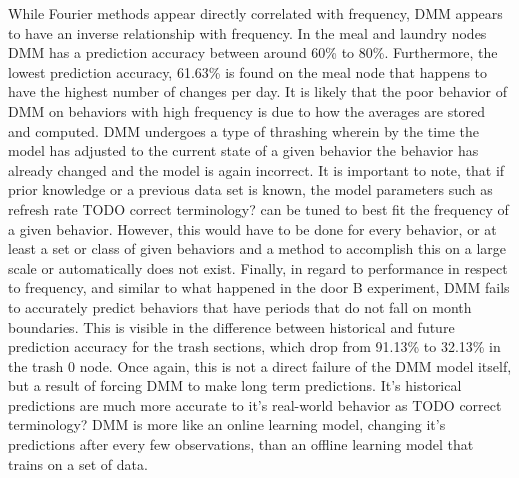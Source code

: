 While Fourier methods appear directly correlated with frequency, DMM
appears to have an inverse relationship with frequency. In the meal and
laundry nodes DMM has a prediction accuracy between around 60\% to 80\%.
Furthermore, the lowest prediction accuracy, 61.63\% is found on the meal
node that happens to have the highest number of changes per day. It is likely
that the poor behavior of DMM on behaviors with high frequency is due to
how the averages are stored and computed. DMM undergoes a type of
thrashing wherein by the time the model has adjusted to the current state of a given
behavior the behavior has already changed and the model is again incorrect. It is important to note, that if prior knowledge
or a previous data set is known, the model parameters such as refresh rate TODO
correct terminology? can be tuned to best fit the frequency of a given behavior.
However, this would have to be done for every behavior, or at least a set or class
of given behaviors and a method to accomplish this on a large scale or automatically does not exist. Finally, in regard to performance in
respect to frequency, and similar to what happened in the door B experiment,
DMM fails to accurately predict behaviors that have periods that do not
fall on month boundaries. This is visible in the difference between historical
and future prediction accuracy for the trash sections, which drop from
91.13\% to 32.13\% in the trash 0 node. Once again, this is not a direct failure
of the DMM model itself, but a result of forcing DMM to make long
term predictions. It's historical predictions are much more accurate to it's
real-world behavior as TODO correct terminology? DMM is more like
an online learning model, changing it's predictions after every few observations,
than an offline learning model that trains on a set of data. \\




\begin{table}[htb!]
  \centering
  \caption{Hallway Delivery Section}
\end{table}

